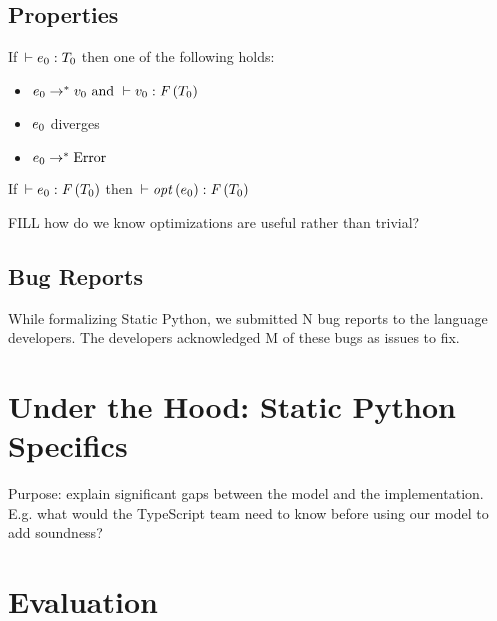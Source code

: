 \documentclass[a4paper,english,cleveref,autoref,thm-restate,anonymous,]{lipics-v2021}
\begin{document}
\subsection{Properties}

\begin{theorem}
  If\ \(\vdash \spexpr_0 : \sptype_0\)
  then one of the following holds:
  \begin{itemize}
    \item
      \(\spexpr_0 \sprred \spvalue_0
        \mbox{ and }
        \vdash \spvalue_0 : \mftypeF{\sptype_0}
      \)
    \item
      \(e_0\) diverges
    \item
      \(e_0 \rightarrow^* \mathrm{Error}\)
  \end{itemize}
\end{theorem}

\begin{theorem}
  If\ \(\vdash \spexpr_0 : \mftypeF{\sptype_0}\)
  then\ \(\vdash \mfopt{\spexpr_0} : \mftypeF{\sptype_0}\)
\end{theorem}

\begin{theorem}
  FILL how do we know optimizations are useful rather than trivial?
\end{theorem}


\subsection{Bug Reports}

While formalizing Static Python, we submitted N bug reports to the language developers.
The developers acknowledged M of these bugs as issues to fix.


\section{Under the Hood: Static Python Specifics}
\label{s:impl}

Purpose: explain significant gaps between the model and the implementation.
E.g. what would the TypeScript team need to know before using our model
to add soundness?


\section{Evaluation}
\label{s:eval}
\end{document}
